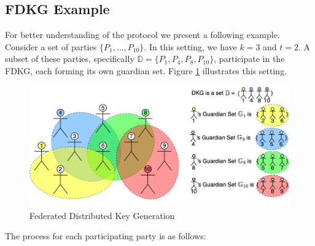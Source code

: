 \documentclass{article}
\begin{document}
\subsection*{FDKG Example}
For better understanding of the protocol we present a following example. Consider a set of parties $\{P_1, \ldots, P_{10}\}$. In this setting, we have $k = 3$ and $t = 2$. A subset of these parties, specifically $\mathbb{D} = \{P_1, P_4, P_8, P_{10}\}$, participate in the FDKG, each forming its own guardian set. Figure \ref{fig:FDKG} illustrates this setting.


\begin{figure}
    \centering
    \includegraphics[width=\textwidth]{FDKG.png}
    \caption{Federated Distributed Key Generation}
    \label{fig:FDKG}
\end{figure}

The process for each participating party is as follows:
\end{document}
